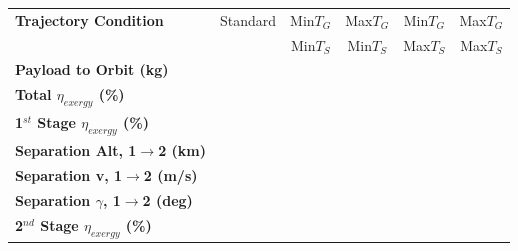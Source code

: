 \begin{table}[ht]
	\centering
	
	\begin{tabular}{l c c c c c} 
		\hline \textbf{Trajectory Condition}
		& Standard
		& Min$T_{G}$ 
		& Max$T_{G}$
		& Min$T_{G}$
		& Max$T_{G}$
		\\
		&
		&  Min$T_{S}$
		& Min$T_{S}$
		&Max$T_{S}$
		& Max$T_{S}$
		\\
		\hline \textbf{Payload to Orbit (kg)}
		& \textbf{\PayloadToOrbitqStandard}
		& \textbf{\PayloadToOrbitMinTGroundMinTStrat}
		& \textbf{\PayloadToOrbitMaxTGroundMinTStrat}
		& \textbf{\PayloadToOrbitMinTGroundMaxTStrat}
		& \textbf{\PayloadToOrbitMaxTGroundMaxTStrat}
		\\
		\textbf{Total $\eta_{exergy}$ (\%)}
		& \textbf{\totalExergyEffqStandard}
		& \textbf{\totalExergyEffMinTGroundMinTStrat}
		& \textbf{\totalExergyEffMaxTGroundMinTStrat}
		& \textbf{\totalExergyEffMinTGroundMaxTStrat}
		& \textbf{\totalExergyEffMaxTGroundMaxTStrat}
		\\
		\hline 
		\textbf{1$^{st}$ Stage $\eta_{exergy}$ (\%)}
		& \textbf{\firstExergyEffqStandard}
		& \textbf{\firstExergyEffMinTGroundMinTStrat}
		& \textbf{\firstExergyEffMaxTGroundMinTStrat}
		& \textbf{\firstExergyEffMinTGroundMaxTStrat}
		& \textbf{\firstExergyEffMaxTGroundMaxTStrat}
		\\
		\textbf{Separation Alt, 1$\rightarrow$2 (km)}
		& \firstsecondSeparationAltqStandard
		& \firstsecondSeparationAltMinTGroundMinTStrat
		& \firstsecondSeparationAltMaxTGroundMinTStrat
		& \firstsecondSeparationAltMinTGroundMaxTStrat
		& \firstsecondSeparationAltMaxTGroundMaxTStrat
		\\
		\textbf{Separation v, 1$\rightarrow$2 (m/s)}
		& \firstsecondSeparationvqStandard
		& \firstsecondSeparationvMinTGroundMinTStrat
		& \firstsecondSeparationvMaxTGroundMinTStrat
		& \firstsecondSeparationvMinTGroundMaxTStrat
		& \firstsecondSeparationvMaxTGroundMaxTStrat
		\\
		\textbf{Separation $\gamma$, 1$\rightarrow$2 (deg)}
		& \firstsecondSeparationgammaqStandard
		& \firstsecondSeparationgammaMinTGroundMinTStrat
		& \firstsecondSeparationgammaMaxTGroundMinTStrat
		& \firstsecondSeparationgammaMinTGroundMaxTStrat
		& \firstsecondSeparationgammaMaxTGroundMaxTStrat
		\\
		\hline 
		\textbf{2$^{nd}$ Stage $\eta_{exergy}$ (\%)}
		& \textbf{\secondExergyEffqStandard}
		& \textbf{\secondExergyEffMinTGroundMinTStrat}
		& \textbf{\secondExergyEffMaxTGroundMinTStrat}
		& \textbf{\secondExergyEffMinTGroundMaxTStrat}

\end{tabular}
\end{table}

